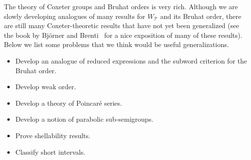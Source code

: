 \documentclass[ALCO,ThmDefs,Unicode]{cedram}
\newcommand{\cT}{\mathcal{T}}
\newcommand{\WTits}{W_{\TitsCone}}
\newcommand{\TitsCone}{\cT}
\begin{document}
The theory of Coxeter groups and Bruhat orders is very rich. Although we are slowly developing analogues of many results for $\WTits$ and its Bruhat order, there are still many Coxeter-theoretic results that have not yet been generalized (see the book by Bj\"{o}rner and Brenti~\cite{BB} for a nice exposition of many of these results). Below we list some problems that we think would be useful generalizations.
\begin{itemize}
\item Develop an analogue of reduced expressions and the subword criterion for the Bruhat order.
\item Develop weak order.
\item Develop a theory of Poincaré series.
\item Develop a notion of parabolic sub-semigroups.
\item Prove shellability results.
\item Classify short intervals.
\end{itemize}




\end{document}

